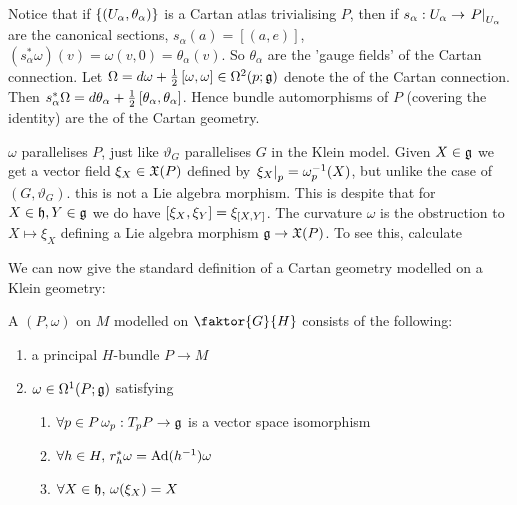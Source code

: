 \documentclass{article}
\begin{document}
Notice that if $\pbrace{(U_\alpha,\theta_\alpha)}$ is a Cartan atlas trivialising $P$, then if $s_\alpha : U_\alpha \to \ev{P}{U_\alpha}$ are the canonical sections, $s_\alpha(a) = [(a,e)]$, $(s_\alpha^\ast \omega)(v) = \omega(v,0) = \theta_\alpha(v)$. So $\theta_\alpha$ are the 'gauge fields' of the Cartan connection. Let $\Omega = d\omega + \frac{1}{2} \comm[\omega]{\omega}\in \Omega^2(p;\mf{g})$ denote the  of the Cartan connection. Then $s_\alpha^\ast \Omega = d\theta_\alpha + \frac{1}{2} \comm[\theta_\alpha]{\theta_\alpha}$. Hence bundle automorphisms of $P$ (covering the identity) are the  of the Cartan geometry. 

\begin{remark}
	$\omega$ parallelises $P$, just like $\vartheta_G$ parallelises $G$ in the Klein model. Given $X \in \mf{g}$ we get a vector field $\xi_X \in \mf{X}(P)$ defined by $\ev{\xi_X}{p} = \omega^{-1}_p(X)$, but unlike the case of $(G,\vartheta_G)$. this is not a Lie algebra morphism. This is despite that for $X \in \mf{h}, Y \in \mf{g}$ we do have $\comm[\xi_X]{\xi_Y} = \xi_{\comm[X]{Y}}$. The curvature $\omega$ is the obstruction to $X \mapsto \xi_X$ defining a Lie algebra morphism $\mf{g} \to \mf{X}(P)$. To see this, calculate
\end{remark}

We can now give the standard definition of a Cartan geometry modelled on a Klein geometry:

\begin{definition}
	A  $(P,\omega)$ on $M$ modelled on $\faktor{G}{H}$ consists of the following:
	\begin{enumerate}
		\item a principal $H$-bundle $P \to M$
		\item $\omega \in \Omega^1(P;\mf{g})$ satisfying 
		\begin{enumerate}
			\item $\forall p \in P\, \omega_p : T_pP \to \mf{g}$ is a vector space isomorphism 
			\item $\forall h \in H, \, r_h^\ast \omega = \Ad(h^{-1}) \omega$
			\item $\forall X \in \mf{h}, \, \omega(\xi_X) = X$
		\end{enumerate}
	\end{enumerate}
\end{definition}
\end{document}
